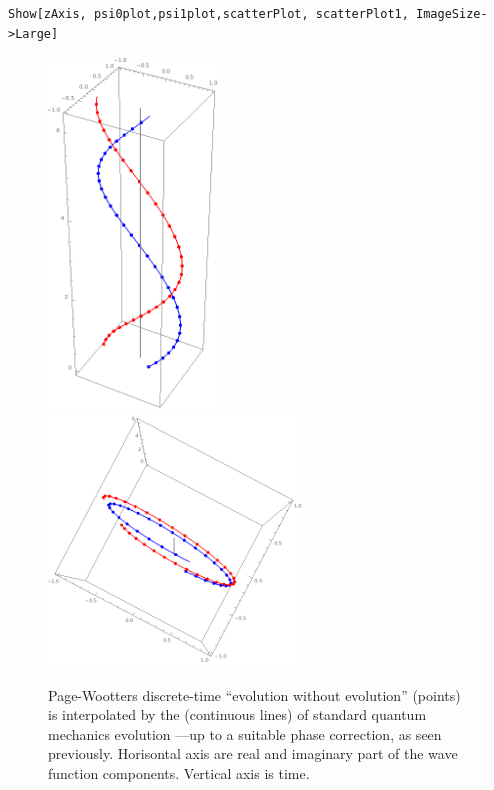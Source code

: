 \begin{lstlisting}
Show[zAxis, psi0plot,psi1plot,scatterPlot, scatterPlot1, ImageSize->Large]
\end{lstlisting}
\begin{figure}[h]
  \centering
  \includegraphics[width=0.4\textwidth]{img/PWfit32.png}
  \includegraphics[width=0.6\textwidth]{img/PWfit32top.png}
  \caption[(from notebook)]{
    Page-Wootters discrete-time ``evolution without evolution'' (points)
    is interpolated by the (continuous lines) of standard quantum mechanics
    evolution ---up to a suitable phase correction, as seen previously.
    Horisontal axis are real and imaginary part of the wave function components.
    Vertical axis is time. 
  }
\end{figure}
